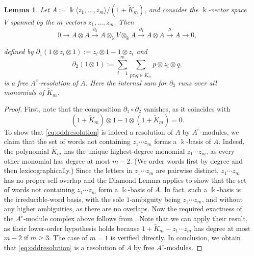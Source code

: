 \documentclass[11pt]{article}
\newtheorem{lemma}[theorem]{Lemma}
\newcommand{\kk}{\Bbbk}
\begin{document}
\begin{lemma}\label{prop:oddresolution} Let $A:=\kk\langle z_1,\ldots,z_m\rangle/(1+\widetilde K_m)$, and consider the $\kk$-vector space $V$ spanned by the $m$ vectors $z_1,\ldots,z_m$. Then
\begin{equation}\label{eq:oddresolution}
0\to A\otimes A\xrightarrow{\partial_2}
A\otimes_\kk V \otimes_\kk A
\xrightarrow{\partial_1}A\otimes A\xrightarrow{\mu}A\to0,
\end{equation}

defined by $\partial_1(1\otimes z_i\otimes1):=z_i\otimes1-1\otimes z_i$ and
$$
 \partial_2(1\otimes1):=
 \sum_{i=1}^m\sum_{p z_iq\in\widetilde K_m}p\otimes z_i\otimes q,
$$
is a free $A^e$-resolution of $A$. Here the internal sum for $\partial_2$ runs over all monomials of $\widetilde K_m$.
\end{lemma}
\begin{proof}
First, note that the composition $\partial_1\circ\partial_2$ vanishes, as it coincides with 
$$(1+\widetilde K_m)\otimes1-1\otimes (1+\widetilde K_m)=0.$$
To show that \eqref{eq:oddresolution} is indeed a resolution of $A$ by $A^e$-modules, we claim that the set of words not containing $z_1\cdots z_m$ forms a $\kk$-basis of $A$. Indeed, the polynomial $\widetilde K_m$ has the unique highest-degree monomial $z_1\cdots z_m$, as every other monomial has degree at
most $m-2$. (We order words first by degree and then lexicographically.) Since the letters in $z_1\cdots z_m$
are pairwise distinct, $z_1\cdots z_m$ has no proper self-overlap and the Diamond
Lemma \cite[Theorem~1.2]{Bergman} applies to show that the set of words not containing $z_1\cdots z_m$ form a $\kk$-basis of $A$. In fact, such a $\kk$-basis is the irreducible-word basis, with the sole $1$-ambiguity being $z_1\cdots z_m$, and without any higher ambiguities, as there are no overlaps. Now the required exactness of the $A^e$-module complex above follows from \cite[Theorem~4.1]{CS}. Note that we can apply their result, as their lower-order hypothesis holds because $1+\widetilde K_m-z_1\cdots z_m$ has degree at most $m-2$ if $m\geq3$. The case of $m=1$ is verified directly. In conclusion, we obtain that \eqref{eq:oddresolution} is a resolution of $A$ by free $A^e$-modules.
\end{proof}
\end{document}
